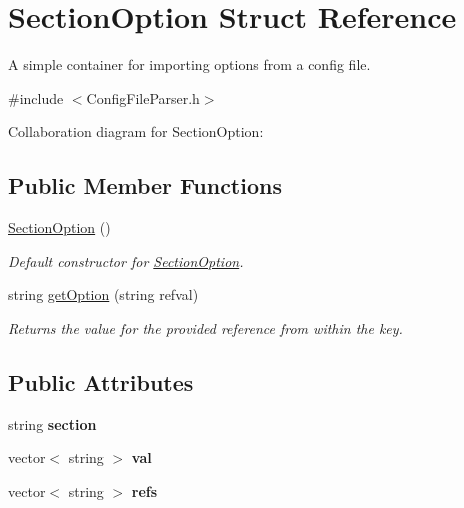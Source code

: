 \hypertarget{struct_section_option}{}\section{Section\+Option Struct Reference}
\label{struct_section_option}


A simple container for importing options from a config file.  




{\ttfamily \#include $<$Config\+File\+Parser.\+h$>$}



Collaboration diagram for Section\+Option\+:
\subsection*{Public Member Functions}
\begin{DoxyCompactItemize}
\item 
\hyperlink{struct_section_option_a0a6a33e41311ea0eef34b76379421362}{Section\+Option} ()\hypertarget{struct_section_option_a0a6a33e41311ea0eef34b76379421362}{}\label{struct_section_option_a0a6a33e41311ea0eef34b76379421362}

\begin{DoxyCompactList}\small\item\em Default constructor for \hyperlink{struct_section_option}{Section\+Option}. \end{DoxyCompactList}\item 
string \hyperlink{struct_section_option_a78d55aa842ba2056764236246492734f}{get\+Option} (string refval)
\begin{DoxyCompactList}\small\item\em Returns the value for the provided reference from within the key. \end{DoxyCompactList}\end{DoxyCompactItemize}
\subsection*{Public Attributes}
\begin{DoxyCompactItemize}
\item 
string {\bfseries section}\hypertarget{struct_section_option_af6dd28af164466810fe9f36091b9d6d1}{}\label{struct_section_option_af6dd28af164466810fe9f36091b9d6d1}

\item 
vector$<$ string $>$ {\bfseries val}\hypertarget{struct_section_option_a789da4aa7aeef3887bcfc94f7cf2c254}{}\label{struct_section_option_a789da4aa7aeef3887bcfc94f7cf2c254}

\item 
vector$<$ string $>$ {\bfseries refs}\hypertarget{struct_section_option_a916b36005e0e1817a9dcf45bf02952e4}{}\label{struct_section_option_a916b36005e0e1817a9dcf45bf02952e4}

\end{DoxyCompactItemize}
